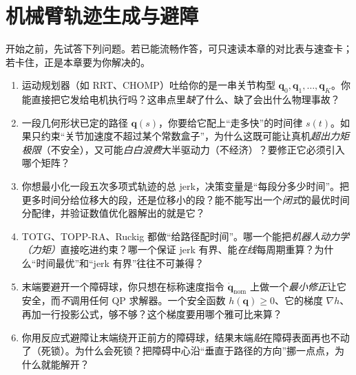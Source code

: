 \chapter{机械臂轨迹生成与避障}
\label{ch:arm-traj}


\begin{practice}[前置自测]
开始之前，先试答下列问题。若已能流畅作答，可只速读本章的对比表与速查卡；若卡住，正是本章要为你解决的。
\begin{enumerate}
  \item 运动规划器（如 RRT、CHOMP）吐给你的是一串关节构型 $\mathbf{q}_0,\mathbf{q}_1,\dots,\mathbf{q}_K$。你能直接把它发给电机执行吗？这串点里\emph{缺}了什么、缺了会出什么物理事故？
  \item 一段几何形状已定的路径 $\mathbf{q}(s)$，你要给它配上“走多快”的时间律 $s(t)$。如果只约束“关节加速度不超过某个常数盒子”，为什么这既可能让真机\emph{超出力矩极限}（不安全），又可能\emph{白白浪费}大半驱动力（不经济）？要修正它必须引入哪个矩阵？
  \item 你想最小化一段五次多项式轨迹的总 jerk，决策变量是“每段分多少时间”。把更多时间分给位移大的段，还是位移小的段？能不能写出一个\emph{闭式}的最优时间分配律，并验证数值优化器解出的就是它？
  \item TOTG、TOPP-RA、Ruckig 都做“给路径配时间”。哪一个能把\emph{机器人动力学（力矩）}直接吃进约束？哪一个保证 jerk 有界、能\emph{在线}每周期重算？为什么“时间最优”和“jerk 有界”往往不可兼得？
  \item 末端要避开一个障碍球，你只想在标称速度指令 $\dot{\mathbf{q}}_{\mathrm{nom}}$ 上做一个\emph{最小修正}让它安全，而\emph{不}调用任何 QP 求解器。一个安全函数 $h(\mathbf{q})\ge 0$、它的梯度 $\nabla h$、再加一行投影公式，够不够？这个梯度要用哪个雅可比来算？
  \item 你用反应式避障让末端绕开正前方的障碍球，结果末端\emph{贴}在障碍表面再也不动了（死锁）。为什么会死锁？把障碍中心沿“垂直于路径的方向”挪一点点，为什么就能解开？
\end{enumerate}
\end{practice}

